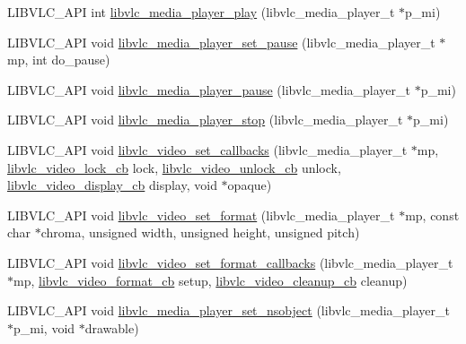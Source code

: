 \begin{DoxyCompactItemize}
\item 
L\+I\+B\+V\+L\+C\+\_\+\+A\+PI int \hyperlink{group__libvlc__media__player_gac5da60e52d11c81c7a6a61f470aa1646}{libvlc\+\_\+media\+\_\+player\+\_\+play} (libvlc\+\_\+media\+\_\+player\+\_\+t $\ast$p\+\_\+mi)
\item 
L\+I\+B\+V\+L\+C\+\_\+\+A\+PI void \hyperlink{group__libvlc__media__player_ga6e39882b33a22337cec9fd49dd7e23c4}{libvlc\+\_\+media\+\_\+player\+\_\+set\+\_\+pause} (libvlc\+\_\+media\+\_\+player\+\_\+t $\ast$mp, int do\+\_\+pause)
\item 
L\+I\+B\+V\+L\+C\+\_\+\+A\+PI void \hyperlink{group__libvlc__media__player_ga61712d4eb8f63232c712a81fb19ee8fa}{libvlc\+\_\+media\+\_\+player\+\_\+pause} (libvlc\+\_\+media\+\_\+player\+\_\+t $\ast$p\+\_\+mi)
\item 
L\+I\+B\+V\+L\+C\+\_\+\+A\+PI void \hyperlink{group__libvlc__media__player_gacefc05e7806905447a436d3fc242e6de}{libvlc\+\_\+media\+\_\+player\+\_\+stop} (libvlc\+\_\+media\+\_\+player\+\_\+t $\ast$p\+\_\+mi)
\item 
L\+I\+B\+V\+L\+C\+\_\+\+A\+PI void \hyperlink{group__libvlc__media__player_ga612605f2e5c638d9f4ed59021d714bf0}{libvlc\+\_\+video\+\_\+set\+\_\+callbacks} (libvlc\+\_\+media\+\_\+player\+\_\+t $\ast$mp, \hyperlink{group__libvlc__media__player_ga193de3e82f6de3f9d8f5ccd8b5f2aa98}{libvlc\+\_\+video\+\_\+lock\+\_\+cb} lock, \hyperlink{group__libvlc__media__player_ga024c0f0bba9d3b32a881c40f3cb479bb}{libvlc\+\_\+video\+\_\+unlock\+\_\+cb} unlock, \hyperlink{group__libvlc__media__player_ga2189c9deefc2154ddc5d5f1871b0a106}{libvlc\+\_\+video\+\_\+display\+\_\+cb} display, void $\ast$opaque)
\item 
L\+I\+B\+V\+L\+C\+\_\+\+A\+PI void \hyperlink{group__libvlc__media__player_ga6518394e05d458731c11c86edb23f4cc}{libvlc\+\_\+video\+\_\+set\+\_\+format} (libvlc\+\_\+media\+\_\+player\+\_\+t $\ast$mp, const char $\ast$chroma, unsigned width, unsigned height, unsigned pitch)
\item 
L\+I\+B\+V\+L\+C\+\_\+\+A\+PI void \hyperlink{group__libvlc__media__player_gafbeef69fb76b4c4d6cb25145aee1ad99}{libvlc\+\_\+video\+\_\+set\+\_\+format\+\_\+callbacks} (libvlc\+\_\+media\+\_\+player\+\_\+t $\ast$mp, \hyperlink{group__libvlc__media__player_gae46128c21d0d0151aca3ba017d1d6b35}{libvlc\+\_\+video\+\_\+format\+\_\+cb} setup, \hyperlink{group__libvlc__media__player_ga47f87563b82ed4b6d70ef51243003ae9}{libvlc\+\_\+video\+\_\+cleanup\+\_\+cb} cleanup)
\item 
L\+I\+B\+V\+L\+C\+\_\+\+A\+PI void \hyperlink{group__libvlc__media__player_ga46c26a395b496e48917101198acc31f6}{libvlc\+\_\+media\+\_\+player\+\_\+set\+\_\+nsobject} (libvlc\+\_\+media\+\_\+player\+\_\+t $\ast$p\+\_\+mi, void $\ast$drawable)

\end{DoxyCompactItemize}
